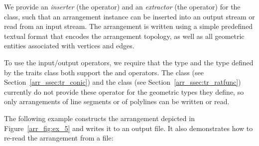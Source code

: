 We provide an {\em inserter} (the \ccc{<<} operator) and an {\em extractor}
(the \ccc{>>} operator) for the  class,
such that an arrangement instance can be inserted into an output stream
or read from an input stream. The arrangement is written using a simple
predefined textual format that encodes the arrangement topology, as
well as all geometric entities associated with vertices and edges.

To use the input/output operators, we require that the  type
and the  type defined by the traits class both
support the \ccc{<<} and\ccc{>>} operators. The 
class (see Section~\ref{arr_ssec:tr_conic}) and the 
 class (see Section~\ref{arr_ssec:tr_ratfunc})
currently do not provide these operator for the geometric types
they define, so only arrangements of line segments or of polylines can
be written or read.

The following example constructs the arrangement depicted in 
Figure~\ref{arr_fig:ex_5} and writes it to an output file. It also
demonstrates how to re-read the arrangement from a file:


